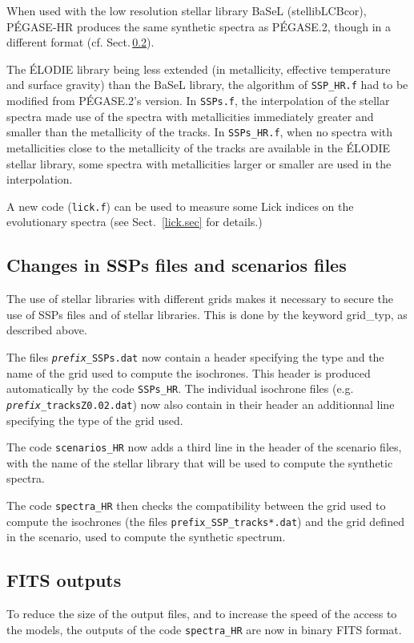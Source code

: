 \documentclass[11pt,fleqn]{article}
\begin{document}
When used with the low resolution stellar
library BaSeL (stellibLCBcor),  P\'EGASE-HR produces the same synthetic spectra as
P\'EGASE.2, though in a different format (cf. Sect.\,\ref{FITSout.sec}).



The \'ELODIE library being less extended (in metallicity, effective
temperature and surface gravity) than the BaSeL library, the algorithm
of \texttt{SSP\_HR.f} had to be modified from P\'EGASE.2's version.  In
\texttt{SSPs.f}, the interpolation of the stellar spectra made use of
the spectra with metallicities immediately greater and smaller than
the metallicity of the tracks. In \texttt{SSPs\_HR.f}, when no spectra
with metallicities close to the metallicity of the tracks are
available in the \'ELODIE stellar library, some spectra with
metallicities larger or smaller are used in the interpolation.


A new code (\texttt{lick.f}) can be used to measure some Lick indices
on the evolutionary spectra (see Sect.~\ref{lick.sec} for details.)


\subsection{Changes in SSPs files and scenarios files}
The use of stellar libraries with different grids makes it necessary to
secure the use of SSPs files and of stellar libraries. This is done by
the keyword {\sc grid\_typ}, as described above.

The files \texttt{{\it prefix}\_SSPs.dat} now contain a header
specifying the type and the name of the grid used to compute the
isochrones. This header is produced automatically by the code
\texttt{SSPs\_HR}.  
The individual isochrone files
(e.g. \texttt{{\it prefix}\_tracksZ0.02.dat}) now also
contain in their header an additionnal line specifying the type of the
grid used.

The code \texttt{scenarios\_HR} now adds a third line in the header of
the scenario files, with the name of the stellar library that will be
used to compute the synthetic spectra.

The code \texttt{spectra\_HR} then checks the compatibility between the
grid used to compute the isochrones (the files
\texttt{prefix\_SSP\_tracks*.dat}) and the grid defined in the scenario,
used to compute the synthetic spectrum.

\subsection{FITS outputs}
\label{FITSout.sec}
To reduce the size of the output files, and to increase the speed of
the access to the models, the outputs of the code \texttt{spectra\_HR}
are now in binary FITS format.
\end{document}
